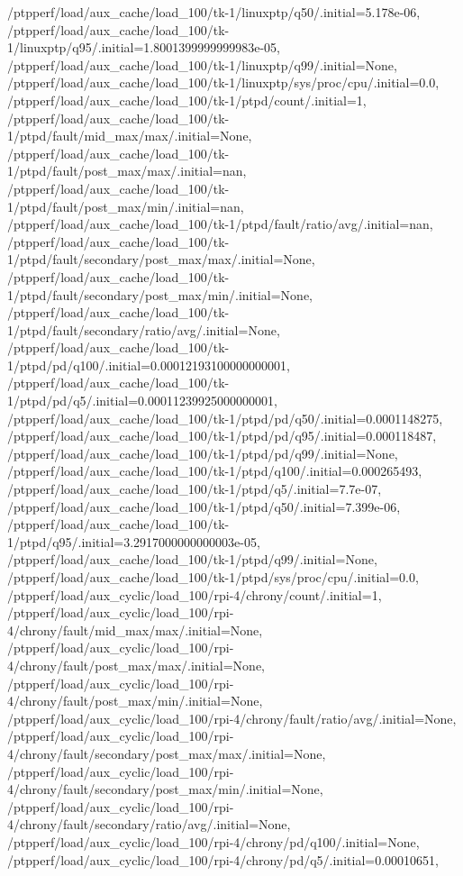 {    /ptpperf/load/aux_cache/load_100/tk-1/linuxptp/q50/.initial=5.178e-06,
    /ptpperf/load/aux_cache/load_100/tk-1/linuxptp/q95/.initial=1.8001399999999983e-05,
    /ptpperf/load/aux_cache/load_100/tk-1/linuxptp/q99/.initial=None,
    /ptpperf/load/aux_cache/load_100/tk-1/linuxptp/sys/proc/cpu/.initial=0.0,
    /ptpperf/load/aux_cache/load_100/tk-1/ptpd/count/.initial=1,
    /ptpperf/load/aux_cache/load_100/tk-1/ptpd/fault/mid_max/max/.initial=None,
    /ptpperf/load/aux_cache/load_100/tk-1/ptpd/fault/post_max/max/.initial=nan,
    /ptpperf/load/aux_cache/load_100/tk-1/ptpd/fault/post_max/min/.initial=nan,
    /ptpperf/load/aux_cache/load_100/tk-1/ptpd/fault/ratio/avg/.initial=nan,
    /ptpperf/load/aux_cache/load_100/tk-1/ptpd/fault/secondary/post_max/max/.initial=None,
    /ptpperf/load/aux_cache/load_100/tk-1/ptpd/fault/secondary/post_max/min/.initial=None,
    /ptpperf/load/aux_cache/load_100/tk-1/ptpd/fault/secondary/ratio/avg/.initial=None,
    /ptpperf/load/aux_cache/load_100/tk-1/ptpd/pd/q100/.initial=0.00012193100000000001,
    /ptpperf/load/aux_cache/load_100/tk-1/ptpd/pd/q5/.initial=0.00011239925000000001,
    /ptpperf/load/aux_cache/load_100/tk-1/ptpd/pd/q50/.initial=0.0001148275,
    /ptpperf/load/aux_cache/load_100/tk-1/ptpd/pd/q95/.initial=0.000118487,
    /ptpperf/load/aux_cache/load_100/tk-1/ptpd/pd/q99/.initial=None,
    /ptpperf/load/aux_cache/load_100/tk-1/ptpd/q100/.initial=0.000265493,
    /ptpperf/load/aux_cache/load_100/tk-1/ptpd/q5/.initial=7.7e-07,
    /ptpperf/load/aux_cache/load_100/tk-1/ptpd/q50/.initial=7.399e-06,
    /ptpperf/load/aux_cache/load_100/tk-1/ptpd/q95/.initial=3.2917000000000003e-05,
    /ptpperf/load/aux_cache/load_100/tk-1/ptpd/q99/.initial=None,
    /ptpperf/load/aux_cache/load_100/tk-1/ptpd/sys/proc/cpu/.initial=0.0,
    /ptpperf/load/aux_cyclic/load_100/rpi-4/chrony/count/.initial=1,
    /ptpperf/load/aux_cyclic/load_100/rpi-4/chrony/fault/mid_max/max/.initial=None,
    /ptpperf/load/aux_cyclic/load_100/rpi-4/chrony/fault/post_max/max/.initial=None,
    /ptpperf/load/aux_cyclic/load_100/rpi-4/chrony/fault/post_max/min/.initial=None,
    /ptpperf/load/aux_cyclic/load_100/rpi-4/chrony/fault/ratio/avg/.initial=None,
    /ptpperf/load/aux_cyclic/load_100/rpi-4/chrony/fault/secondary/post_max/max/.initial=None,
    /ptpperf/load/aux_cyclic/load_100/rpi-4/chrony/fault/secondary/post_max/min/.initial=None,
    /ptpperf/load/aux_cyclic/load_100/rpi-4/chrony/fault/secondary/ratio/avg/.initial=None,
    /ptpperf/load/aux_cyclic/load_100/rpi-4/chrony/pd/q100/.initial=None,
    /ptpperf/load/aux_cyclic/load_100/rpi-4/chrony/pd/q5/.initial=0.00010651,
}
